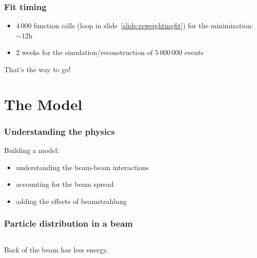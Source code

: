 \documentclass{beamer}
\begin{document}
\begin{frame}
\frametitle{Fit timing}
\begin{itemize}
  \item 4\,000 function calls (loop in slide~\ref{slide:reweightingfit}) for the minimization:
  $\sim12$h
  \item 2 weeks for the simulation/reconstruction of 5\,000\,000 events
\end{itemize}
\begin{center}
\alert{That's the way to go!}
\end{center}
\end{frame}

\section{The Model}
\begin{frame}
\frametitle{Understanding the physics}
Building a model:
\begin{itemize}
  \item understanding the beam-beam interactions
  \item accounting for the beam spread
  \item adding the effects of beamstrahlung
\end{itemize}
\end{frame}

\begin{frame}
\frametitle{Particle distribution in a beam}\label{slide:evsz}
\begin{columns}[c]
\column{6cm}
\column{6cm}
\end{columns}

Back of the beam has less energy.
\end{frame}
\end{document}
